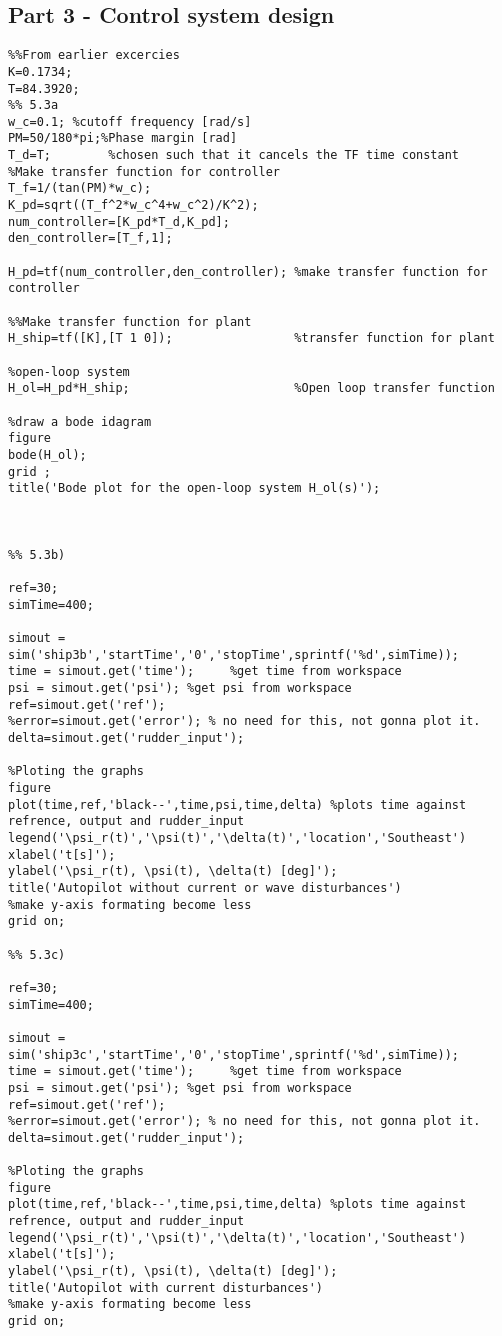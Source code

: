 \subsection{Part 3 - Control system design}
\begin{lstlisting}
%%From earlier excercies 
K=0.1734;
T=84.3920;
%% 5.3a
w_c=0.1; %cutoff frequency [rad/s]
PM=50/180*pi;%Phase margin [rad]
T_d=T;        %chosen such that it cancels the TF time constant
%Make transfer function for controller
T_f=1/(tan(PM)*w_c);    
K_pd=sqrt((T_f^2*w_c^4+w_c^2)/K^2);
num_controller=[K_pd*T_d,K_pd];
den_controller=[T_f,1];

H_pd=tf(num_controller,den_controller); %make transfer function for controller

%%Make transfer function for plant
H_ship=tf([K],[T 1 0]);                 %transfer function for plant

%open-loop system
H_ol=H_pd*H_ship;                       %Open loop transfer function

%draw a bode idagram
figure
bode(H_ol);
grid ;
title('Bode plot for the open-loop system H_ol(s)');



%% 5.3b)

ref=30;
simTime=400; 

simout = sim('ship3b','startTime','0','stopTime',sprintf('%d',simTime));
time = simout.get('time');     %get time from workspace
psi = simout.get('psi'); %get psi from workspace
ref=simout.get('ref');
%error=simout.get('error'); % no need for this, not gonna plot it.
delta=simout.get('rudder_input');

%Ploting the graphs
figure
plot(time,ref,'black--',time,psi,time,delta) %plots time against refrence, output and rudder_input
legend('\psi_r(t)','\psi(t)','\delta(t)','location','Southeast')
xlabel('t[s]');
ylabel('\psi_r(t), \psi(t), \delta(t) [deg]'); 
title('Autopilot without current or wave disturbances')
%make y-axis formating become less
grid on;

%% 5.3c)

ref=30;
simTime=400; 

simout = sim('ship3c','startTime','0','stopTime',sprintf('%d',simTime));
time = simout.get('time');     %get time from workspace
psi = simout.get('psi'); %get psi from workspace
ref=simout.get('ref');
%error=simout.get('error'); % no need for this, not gonna plot it.
delta=simout.get('rudder_input');

%Ploting the graphs
figure
plot(time,ref,'black--',time,psi,time,delta) %plots time against refrence, output and rudder_input
legend('\psi_r(t)','\psi(t)','\delta(t)','location','Southeast')
xlabel('t[s]');
ylabel('\psi_r(t), \psi(t), \delta(t) [deg]'); 
title('Autopilot with current disturbances')
%make y-axis formating become less
grid on;


\end{lstlisting}
